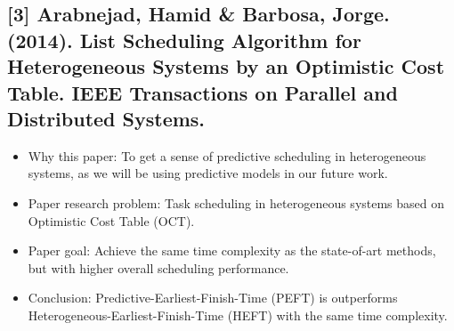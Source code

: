\documentclass[twocolumn,11pt]{IEEEtran}
\begin{document}
    \subsection*{[3] Arabnejad, Hamid \& Barbosa, Jorge. (2014). List Scheduling Algorithm for Heterogeneous Systems by an Optimistic Cost Table. IEEE Transactions on Parallel and Distributed Systems.}
    \begin{itemize}
        \item Why this paper: To get a sense of predictive scheduling in heterogeneous systems, as we will be using predictive models in our future work.
        \item Paper research problem: Task scheduling in heterogeneous systems based on Optimistic Cost Table (OCT).
        \item Paper goal: Achieve the same time complexity as the state-of-art methods, but with higher overall scheduling performance.
        \item Conclusion: Predictive-Earliest-Finish-Time (PEFT) is outperforms Heterogeneous-Earliest-Finish-Time (HEFT) with the same time complexity.
    \end{itemize} 
\end{document}
